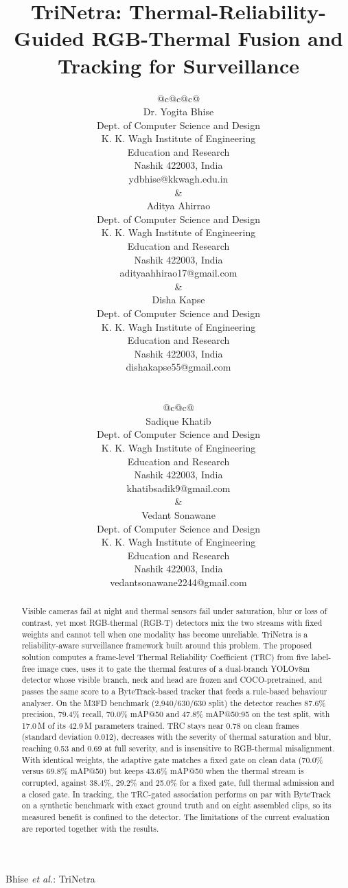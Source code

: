 \documentclass[journal]{IEEEtran}
\makeatletter
\renewcommand{\arraystretch}{1.08}
\newcommand{\authorcell}[2]{%
\renewcommand{\arraystretch}{0.82}%
\begin{tabular}[t]{@{}c@{}}
{\large #1}\\[1pt]
{\small Dept. of Computer Science and Design}\\
{\small K. K. Wagh Institute of Engineering}\\
{\small Education and Research}\\
{\small Nashik 422003, India}\\[2pt]
{\small #2}
\end{tabular}}
\makeatother
\begin{document}
\title{TriNetra: Thermal-Reliability-Guided RGB-Thermal Fusion and Tracking for Surveillance}

\author{%
\begin{tabular}[t]{@{}c@{\hspace{2.6em}}c@{\hspace{2.6em}}c@{}}
\authorcell{Dr. Yogita Bhise}{ydbhise@kkwagh.edu.in} &
\authorcell{Aditya Ahirrao}{adityaahhirao17@gmail.com} &
\authorcell{Disha Kapse}{dishakapse55@gmail.com}
\end{tabular}\\[1.6ex]
\begin{tabular}[t]{@{}c@{\hspace{2.6em}}c@{}}
\authorcell{Sadique Khatib}{khatibsadik9@gmail.com} &
\authorcell{Vedant Sonawane}{vedantsonawane2244@gmail.com}
\end{tabular}}

%
{Bhise \MakeLowercase{\textit{et al.}}: TriNetra}

\maketitle

\begin{abstract}
Visible cameras fail at night and thermal sensors fail under saturation, blur or loss of contrast, yet most RGB-thermal (RGB-T) detectors mix the two streams with fixed weights and cannot tell when one modality has become unreliable. TriNetra is a reliability-aware surveillance framework built around this problem. The proposed solution computes a frame-level Thermal Reliability Coefficient (TRC) from five label-free image cues, uses it to gate the thermal features of a dual-branch YOLOv8m detector whose visible branch, neck and head are frozen and COCO-pretrained, and passes the same score to a ByteTrack-based tracker that feeds a rule-based behaviour analyser. On the M3FD benchmark (2,940/630/630 split) the detector reaches 87.6\% precision, 79.4\% recall, 70.0\% mAP@50 and 47.8\% mAP@50:95 on the test split, with 17.0\,M of its 42.9\,M parameters trained. TRC stays near 0.78 on clean frames (standard deviation 0.012), decreases with the severity of thermal saturation and blur, reaching 0.53 and 0.69 at full severity, and is insensitive to RGB-thermal misalignment. With identical weights, the adaptive gate matches a fixed gate on clean data (70.0\% versus 69.8\% mAP@50) but keeps 43.6\% mAP@50 when the thermal stream is corrupted, against 38.4\%, 29.2\% and 25.0\% for a fixed gate, full thermal admission and a closed gate. In tracking, the TRC-gated association performs on par with ByteTrack on a synthetic benchmark with exact ground truth and on eight assembled clips, so its measured benefit is confined to the detector. The limitations of the current evaluation are reported together with the results.
\end{abstract}
\end{document}
